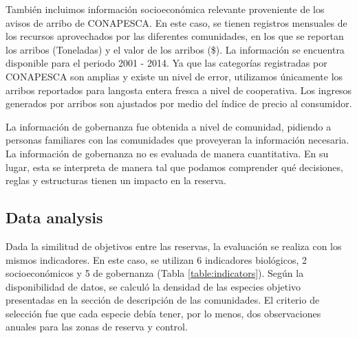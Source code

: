 \documentclass{frontiersSCNS}
\begin{document}
También incluimos información socioeconómica relevante proveniente de
los avisos de arribo de CONAPESCA. En este caso, se tienen registros
mensuales de los recursos aprovechados por las diferentes comunidades,
en los que se reportan los arribos (Toneladas) y el valor de los arribos
(\$). La información se encuentra disponible para el periodo 2001 -
2014. Ya que las categorías registradas por CONAPESCA son amplias y
existe un nivel de error, utilizamos únicamente los arribos reportados
para langosta entera fresca a nivel de cooperativa. Los ingresos
generados por arribos son ajustados por medio del índice de precio al
consumidor.

La información de gobernanza fue obtenida a nivel de comunidad, pidiendo
a personas familiares con las comunidades que proveyeran la información
necesaria. La información de gobernanza no es evaluada de manera
cuantitativa. En su lugar, esta se interpreta de manera tal que podamos
comprender qué decisiones, reglas y estructuras tienen un impacto en la
reserva.

\subsection{Data analysis}\label{data-analysis}

Dada la similitud de objetivos entre las reservas, la evaluación se
realiza con los mismos indicadores. En este caso, se utilizan 6
indicadores biológicos, 2 socioeconómicos y 5 de gobernanza (Tabla
\ref{table:indicators}). Según la disponibilidad de datos, se calculó la
densidad de las especies objetivo presentadas en la sección de
descripción de las comunidades. El criterio de selección fue que cada
especie debía tener, por lo menos, dos observaciones anuales para las
zonas de reserva y control.
\end{document}
